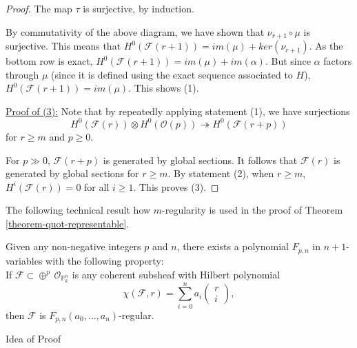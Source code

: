\documentclass[ignorenonframetext,t]{beamer}
\newcommand{\sF}{{\mathcal F}}
\newcommand{\sO}{{\mathcal O}}
\renewcommand{\P}{{\mathbb P}}
\theoremstyle{definition}
\begin{document}
\begin{proof}
	The map $\tau$ is surjective, by induction.
	
	By commutativity of the above diagram, we have shown that $\nu_{r+1}\circ\mu$ is surjective. This means that $H^0(\sF(r+1))=im(\mu)+ker(\nu_{r+1})$. As the bottom row is exact, $H^0(\sF(r+1))=im(\mu)+ im(\alpha)$. But since $\alpha$ factors through $\mu$ (since it is defined using the exact sequence associated to $H$), $H^0(\sF(r+1))=im(\mu)$. This shows (1).
	
	\noindent\underline{Proof of (3):} Note that by repeatedly applying statement (1), we have surjections
	\[H^0(\sF(r))\otimes H^0(\sO(p))\twoheadrightarrow H^0(\sF(r+p))\]
	for $r\geq m$ and $p\geq 0$. 
	
	For $p\gg 0$, $\sF(r+p)$ is generated by global sections. It follows that $\sF(r)$ is generated by global sections for $r\geq m$. By statement (2), when $r\geq m$, $H^i(\sF(r))=0$ for all $i\geq 1$. This proves (3).
\end{proof}


The following technical result how $m$-regularity is used in the proof of Theorem \ref{theorem-quot-representable}.

\begin{frame}
\begin{theorem}[Mumford]
	Given any non-negative integers $p$ and $n$, there exists a polynomial $F_{p,n}$ in $n+1$-variables with the following property:\\
	If $\sF\subset \oplus^p\, \sO_{\P^n_k}$ is any coherent subsheaf  with Hilbert polynomial 
	\[\chi(\sF,r)=\overset{n}{\underset{i=0}{\sum}} a_i 
	\begin{pmatrix}
	r\\
	i	
	\end{pmatrix},\]
	then $\sF$ is $F_{p,n}(a_0,\ldots,a_n)$-regular.
\end{theorem}
\end{frame}

\begin{frame}
	Idea of Proof
\end{frame}
\end{document}
